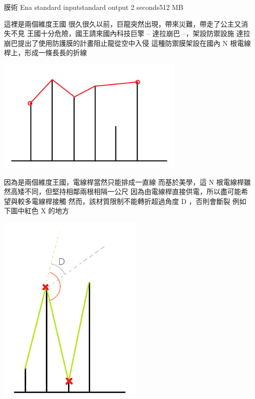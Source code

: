 \gdef\thisproblemauthor{}
\gdef\thisproblemdeveloper{}
\gdef\thisproblemorigin{}
\begin{problem}{膜術 Ena}
{standard input}{standard output}
{2 seconds}{512 MB}{}

這裡是兩個維度王國\newline
很久很久以前，巨龍突然出現，帶來災難，帶走了公主又消失不見\newline
王國十分危險，國王請來國內科技巨擎 -- 達拉崩巴 --，架設防禦設施\newline
達拉崩巴提出了使用防護膜的計畫阻止龍從空中入侵\newline
這種防禦膜架設在國內 N 根電線桿上，形成一條長長的折線\newline

\centerline{\includegraphics[height=15em]{./pics/D-1.png}}

因為是兩個維度王國，電線桿當然只能排成一直線\newline
而基於美學，這 N 根電線桿雖然高矮不同，但堅持相鄰兩根相隔一公尺\newline
\newline
因為由電線桿直接供電，所以盡可能希望與較多電線桿接觸\newline
\newline
然而，該材質限制不能轉折超過角度 D ，否則會斷裂\newline
例如下圖中紅色 X 的地方\newline

\centerline{\includegraphics[height=25em]{./pics/D-2.png}}


\end{problem}
